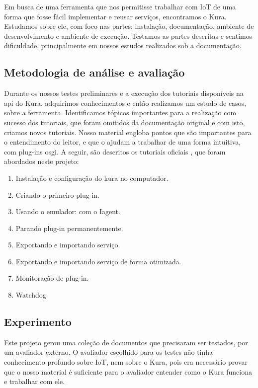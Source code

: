 
Em busca de uma ferramenta que nos permitisse trabalhar com IoT de uma forma que fosse fácil implementar e reusar serviços, encontramos o Kura. Estudamos sobre ele, com foco nas partes: instalação, documentação, ambiente de desenvolvimento e ambiente de execução. Testamos as partes descritas e sentimos dificuldade, principalmente em nossos estudos realizados sob a documentação.

\subsection{Metodologia de análise e avaliação}\label{sec:metodologia}


Durante os nossos testes preliminares e a execução dos tutoriais disponíveis na api do Kura, adquirimos conhecimentos e então realizamos um estudo de casos, sobre a ferramenta. Identificamos tópicos importantes para a realização com sucesso dos tutoriais, que foram omitidos da documentação original e com isto, criamos novos tutoriais. Nosso material engloba pontos que são importantes para o entendimento do leitor, e que o ajudam a trabalhar de uma forma intuitiva, com plug-ins osgi. A seguir, são descritos os tutoriais oficiais \cite{KuraDocumentation}, que foram abordados neste projeto:

\begin{enumerate}
  \item Instalação e configuração do kura no computador.
  \item Criando o primeiro plug-in.
  \item Usando o emulador: com o Iagent.
  \item Parando plug-in permanentemente.
  \item Exportando e importando serviço.
  \item Exportando e importando serviço de forma otimizada.
  \item Monitoração de plug-in.
  \item Watchdog
\end{enumerate}

\subsection{Experimento}


Este projeto gerou uma coleção de documentos que precisaram ser testados, por um avaliador externo. O avaliador escolhido para os testes não tinha conhecimento profundo sobre IoT, nem sobre o Kura, pois era necessário provar que o nosso material é suficiente para o avaliador entender como o Kura funciona e trabalhar com ele.

